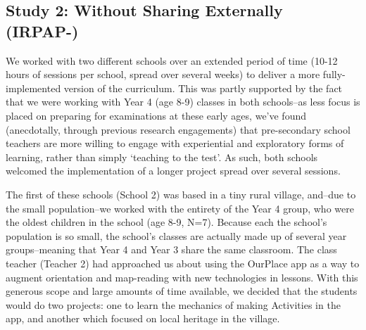 \documentclass[,hyphens]{sigchi}
\begin{document}
\subsection{Study 2: Without Sharing Externally (IRPAP-)}
We worked with two different schools over an extended period of time (10-12 hours of sessions per school, spread over several weeks) to deliver a more fully-implemented version of the curriculum. This was partly supported by the fact that we were working with Year 4 (age 8-9) classes in both schools--as less focus is placed on preparing for examinations at these early ages, we've found (anecdotally, through previous research engagements) that pre-secondary school teachers are more willing to engage with experiential and exploratory forms of learning, rather than simply `teaching to the test'. As such, both schools welcomed the implementation of a longer project spread over several sessions.

The first of these schools (School 2) was based in a tiny rural village, and--due to the small population--we worked with the entirety of the Year 4 group, who were the oldest children in the school (age 8-9, N=7). Because each the school's population is so small, the school's classes are actually made up of several year groups--meaning that Year 4 and Year 3 share the same classroom. The class teacher (Teacher 2) had approached us about using the OurPlace app as a way to augment orientation and map-reading with new technologies in lessons. With this generous scope and large amounts of time available, we decided that the students would do two projects: one to learn the mechanics of making Activities in the app, and another which focused on local heritage in the village. 
\end{document}
